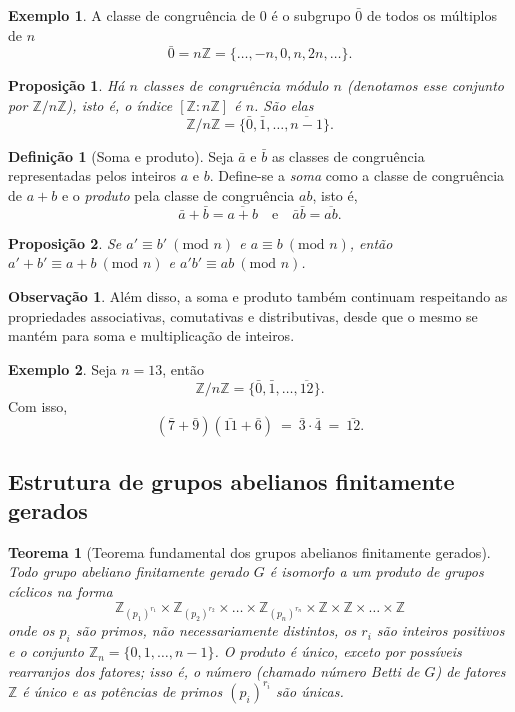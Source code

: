 \documentclass[a4paper,12pt]{report}
\theoremstyle{plain}
\newtheorem{teorema}{Teorema}[section]
\newtheorem{proposicao}{Proposição}[section]
\theoremstyle{definition}
\newtheorem{definicao}{Definição}[section]
\newtheorem{observacao}{Observação}[section]
\newtheorem{exemplo}{Exemplo}[section]
\begin{document}
\begin{exemplo}
	A classe de congruência de 0 é o subgrupo \(\bar{0}\)
	de todos os múltiplos de \(n\) \[\bar{0} = n\mathbb{Z} = \{\dots,-n,0,n,2n, \dots\}.\]
\end{exemplo}

\begin{proposicao}
	Há \(n\) classes de congruência módulo \(n\) (denotamos esse conjunto por \(\mathbb{Z}/n\mathbb{Z}\)), isto é, o índice \([\mathbb{Z}:n\mathbb{Z}]\) é \(n\). São elas \[\mathbb{Z}/n\mathbb{Z} =  \{\bar{0}, \bar{1},\dots,\overline{n - 1}\}.\]		
\end{proposicao}

\begin{definicao}[Soma e produto]
	Seja \(\bar a\) e \(\bar b\) as classes de congruência representadas pelos inteiros \(a\) e \(b\). Define-se a \emph{soma} como a classe de congruência de \(a+b\) e o \emph{produto} pela classe de congruência \(ab\), isto é, \[\bar a + \bar b = \overline{a+b} \quad \text{e}\quad \bar a\bar b = \overline{ab}.\]	
\end{definicao}

\begin{proposicao}
	Se \(a' \equiv b'\ (\text{mod }n)\) e \(a\equiv b\ (\text{mod }n)\), então
	\(a' + b' \equiv a+b\ (\text{mod }n)\) e
	\(a'b' \equiv ab \ (\text{mod }n)\).
\end{proposicao}

\begin{observacao}
	Além disso, a soma e produto também continuam respeitando as
	propriedades associativas, comutativas e distributivas, desde que o
	mesmo se mantém para soma e multiplicação de inteiros.
\end{observacao}

\begin{exemplo}
	Seja \(n = 13\), então
	\[\mathbb{Z}/n\mathbb{Z} =  \{\bar{0}, \bar{1},\dots,\overline{12}\}.\]
	Com isso,
	\[(\bar 7 + \bar 9)(\bar{11} + \bar 6) \ = \ \bar 3 \cdot \bar 4 \ = \ \bar{12}.\]
\end{exemplo}


\subsection{Estrutura de grupos abelianos finitamente gerados}

\begin{teorema}[Teorema fundamental dos grupos abelianos finitamente gerados] \label{teo:abelianfinitelygenerately}
	Todo grupo abeliano finitamente gerado $G$ é isomorfo a um produto de grupos cíclicos na forma $$\mathbb{Z}_{(p_1)^{r_1}}\times\mathbb{Z}_{(p_2)^{r_2}}\times\dots\times\mathbb{Z}_{(p_n)^{r_n}}\times\mathbb{Z}\times\mathbb{Z}\times\dots\times\mathbb{Z} $$ onde os $p_i$ são primos, não necessariamente distintos, os $r_i$ são inteiros positivos e o conjunto $\mathbb{Z}_n = \{0,1,\dots,n-1\}$. O produto é único, exceto por possíveis rearranjos dos fatores; isso é, o número (chamado \emph{número Betti de $G$}) de fatores $\mathbb{Z}$ é único e as potências de primos $(p_i)^{r_i}$ são únicas.
\end{teorema}
\end{document}
